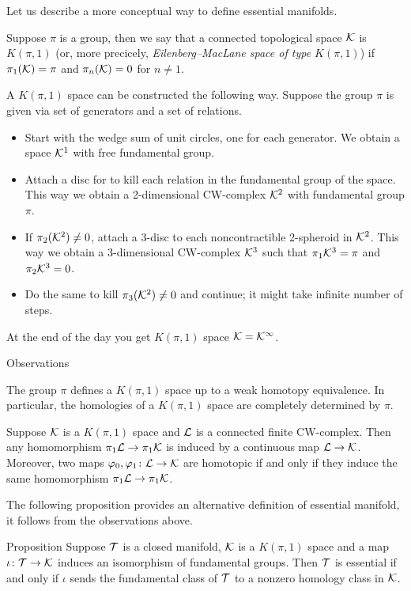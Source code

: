 Let us describe a more conceptual way to define essential manifolds.

Suppose $\pi$ is a group,
then we say that a connected topological space $\mathcal{K}$ is \emph{$K(\pi,1)$} (or, more precicely, \emph{Eilenberg--MacLane space of type $K(\pi,1)$})
if $\pi_1(\mathcal{K})=\pi$ and $\pi_n(\mathcal{K})=0$ for $n\ne 1$.

A $K(\pi,1)$ space can be constructed the following way.
Suppose the group $\pi$ is given via set of generators and a set of relations. 
\begin{itemize}
\item Start with the wedge sum of unit circles, one for each generator.
We obtain a space $\mathcal{K}^1$ with free fundamental group.

\item Attach a disc for to kill each relation in the fundamental group of the space.
This way we obtain a 2-dimensional CW-complex $\mathcal{K}^2$ with fundamental group $\pi$.

\item If $\pi_2(\mathcal{K}^2)\ne0$, attach a $3$-disc to each noncontractible 2-spheroid in $\mathcal{K}^2$.
This way we obtain a 3-dimensional CW-complex $\mathcal{K}^3$ such that  $\pi_1\mathcal{K}^3=\pi$ and $\pi_2\mathcal{K}^3=0$.


\item Do the same to kill $\pi_3(\mathcal{K}^2)\ne0$ and continue; it might take infinite number of steps.
\end{itemize}
At the end of the day you get $K(\pi,1)$ space $\mathcal{K}=\mathcal{K}^\infty$.

\begin{thm}{Observations}

\begin{subthm}{}
The group $\pi$ defines a $K(\pi,1)$ space up to a weak homotopy equivalence.
In particular, the homologies of a $K(\pi,1)$ space are completely determined by $\pi$.
\end{subthm}


\begin{subthm}{}
Suppose $\mathcal{K}$ is a $K(\pi,1)$ space and $\mathcal{L}$ is a connected finite CW-complex.
Then any homomorphism $\pi_1\mathcal{L}\to\pi_1\mathcal{K}$ is induced by a continuous map $\mathcal{L}\to\mathcal{K}$.
Moreover, two maps $\varphi_0,\varphi_1\colon\mathcal{L}\to\mathcal{K}$ are homotopic if and only if they induce the same homomorphism $\pi_1\mathcal{L}\to\pi_1\mathcal{K}$.
\end{subthm}

\end{thm}

The following proposition provides an alternative definition of essential manifold, it follows from the observations above.

\begin{thm}{Proposition}
Suppose $\mathcal{T}$ is a closed manifold, 
$\mathcal{K}$ is a $K(\pi,1)$ space and a map $\iota\colon\mathcal{T}\to \mathcal{K}$ induces an isomorphism of fundamental groups.
Then $\mathcal{T}$ is essential if and only if $\iota$ sends the fundamental class of $\mathcal{T}$ to a nonzero homology class in $\mathcal{K}$.
\end{thm}




